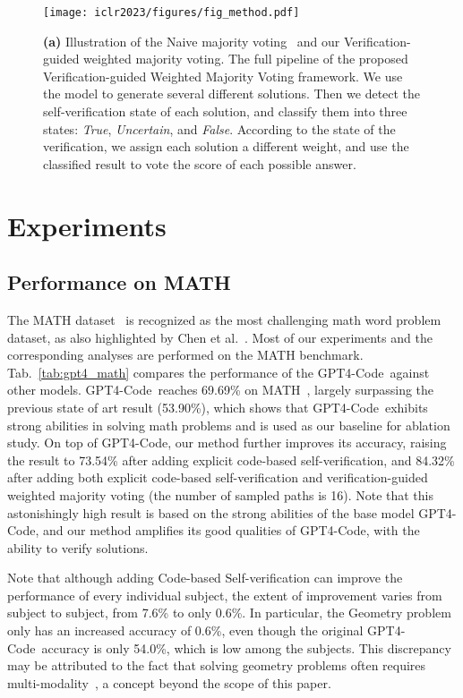 \documentclass{article} \usepackage{iclr2023_conference,times}
\newcommand{\gptcode}{GPT4-Code}
\begin{document}
\begin{figure}[t]
    \centering
    \texttt{[image: iclr2023/figures/fig\_method.pdf]}
    \vspace{-4mm}
    \caption{\textbf{(a)} Illustration of the Naive majority voting~\citep{wang2023selfconsistency} and our Verification-guided weighted majority voting. The full pipeline of the proposed Verification-guided Weighted Majority Voting framework. We use the model to generate several different solutions. Then we detect the self-verification state of each solution, and classify them into three states: \textit{True}, \textit{Uncertain}, and \textit{False}. According to the state of the verification, we assign each solution a different weight, and use the classified result to vote the score of each possible answer. }
    
\label{fig:combined}
\end{figure}

\section{Experiments}

\subsection{Performance on MATH}

The MATH dataset~\citep{hendrycks2021measuring} is recognized as the most challenging math word problem dataset, as also highlighted by Chen et al.~\citep{chen2023theoremqa}. Most of our experiments and the corresponding analyses are performed on the MATH benchmark. Tab.~\ref{tab:gpt4_math} compares the performance of the \gptcode~against other models. \gptcode~reaches 69.69\% on MATH~\citep{Hendrycks2020MeasuringMM}, largely surpassing the previous state of art result (53.90\%), which shows that \gptcode~exhibits strong abilities in solving math problems and is used as our baseline for ablation study. On top of \gptcode, our method further improves its accuracy, raising the result to 73.54\% after adding explicit code-based self-verification, and 84.32\% after adding both explicit code-based self-verification and verification-guided
weighted majority voting (the number of sampled paths is 16). Note that this astonishingly high result is based on the strong abilities of the base model \gptcode, and our method amplifies its good qualities of \gptcode, with the ability to verify solutions.

Note that although adding Code-based Self-verification can improve the performance of every individual subject, the extent of improvement varies from subject to subject, from 7.6\% to only 0.6\%. In particular, the Geometry problem only has an increased accuracy of 0.6\%, even though the original \gptcode~accuracy is only 54.0\%, which is low among the subjects. This discrepancy may be attributed to the fact that solving geometry problems often requires multi-modality~\citep{chen2023theoremqa}, a concept beyond the scope of this paper.
\end{document}
